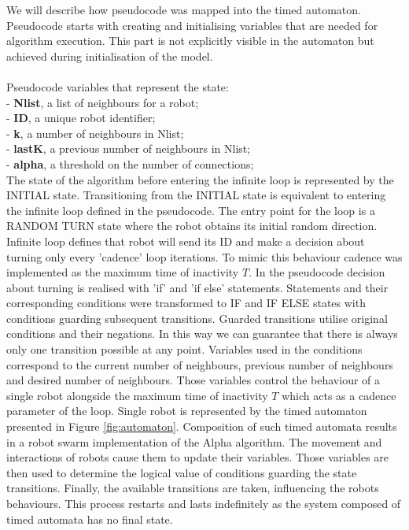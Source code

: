 We will describe how pseudocode was mapped into the timed automaton. Pseudocode starts with creating and initialising variables that are needed for algorithm execution. This part is not explicitly visible in the automaton but achieved during initialisation of the model.\\\\
Pseudocode variables that represent the state:\\
- \textbf{Nlist}, a list of neighbours for a robot;\\
- \textbf{ID}, a unique robot identifier;\\
- \textbf{k}, a number of neighbours in Nlist;\\
- \textbf{lastK}, a previous number of neighbours in Nlist;\\
- \textbf{alpha}, a threshold on the number of connections;\\

 The state of the algorithm before entering the infinite loop is represented by the INITIAL state. Transitioning from the INITIAL state is equivalent to entering the infinite loop defined in the pseudocode. The entry point for the loop is a RANDOM TURN state where the robot obtains its initial random direction. Infinite loop defines that robot will send its ID and make a decision about turning only every 'cadence' loop iterations. To mimic this behaviour cadence was implemented as the maximum time of inactivity $T$. In the pseudocode  decision about turning is realised with 'if' and 'if else' statements. Statements and their corresponding conditions were transformed to IF and IF ELSE states with conditions guarding subsequent transitions. Guarded transitions utilise original conditions and their negations. In this way we can guarantee that there is always only one transition possible at any point. Variables used in the conditions correspond to the current number of neighbours, previous number of neighbours and desired number of neighbours. Those variables control the behaviour of a single robot alongside the maximum time of inactivity $T$ which acts as a cadence parameter of the loop. Single robot is represented by the timed automaton presented in Figure \ref{fig:automaton}. Composition of such timed automata results in a robot swarm implementation of the Alpha algorithm. The movement and interactions of robots cause them to update their variables. Those variables are then used to determine the logical value of conditions guarding the state transitions. Finally, the available transitions are taken, influencing the robots behaviours. This process restarts and lasts indefinitely as the system composed of timed automata has no final state.\\

